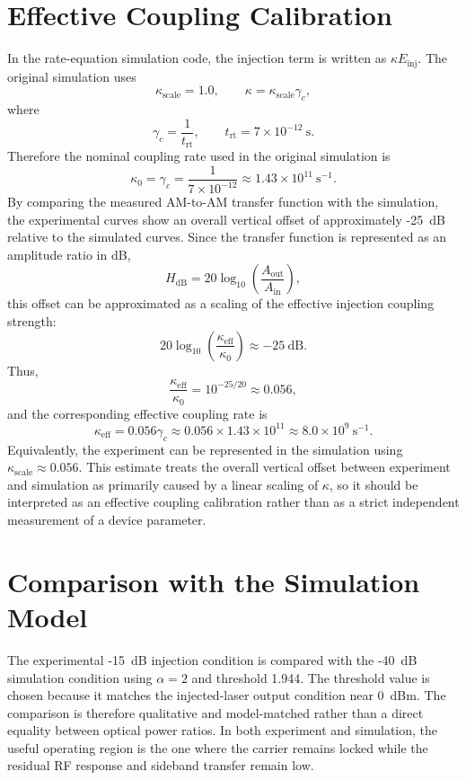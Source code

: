 \section{Effective Coupling Calibration}

In the rate-equation simulation code, the injection term is written as $\kappa E_{\mathrm{inj}}$. The original simulation uses
\[
\kappa_{\mathrm{scale}} = 1.0,\qquad
\kappa = \kappa_{\mathrm{scale}}\gamma_c,
\]
where
\[
\gamma_c=\frac{1}{t_{\mathrm{rt}}},\qquad
t_{\mathrm{rt}}=7\times10^{-12}~\mathrm{s}.
\]
Therefore the nominal coupling rate used in the original simulation is
\[
\kappa_0=\gamma_c=\frac{1}{7\times10^{-12}}
\approx 1.43\times10^{11}~\mathrm{s^{-1}}.
\]
By comparing the measured AM-to-AM transfer function with the simulation, the experimental curves show an overall vertical offset of approximately -25~dB relative to the simulated curves. Since the transfer function is represented as an amplitude ratio in dB,
\[
H_{\mathrm{dB}}
=
20\log_{10}
\left(
\frac{A_{\mathrm{out}}}{A_{\mathrm{in}}}
\right),
\]
this offset can be approximated as a scaling of the effective injection coupling strength:
\[
20\log_{10}
\left(
\frac{\kappa_{\mathrm{eff}}}{\kappa_0}
\right)
\approx -25~\mathrm{dB}.
\]
Thus,
\[
\frac{\kappa_{\mathrm{eff}}}{\kappa_0}
=
10^{-25/20}
\approx 0.056,
\]
and the corresponding effective coupling rate is
\[
\kappa_{\mathrm{eff}}
=
0.056\gamma_c
\approx
0.056\times1.43\times10^{11}
\approx
8.0\times10^9~\mathrm{s^{-1}}.
\]
Equivalently, the experiment can be represented in the simulation using $\kappa_{\mathrm{scale}}\approx0.056$. This estimate treats the overall vertical offset between experiment and simulation as primarily caused by a linear scaling of $\kappa$, so it should be interpreted as an effective coupling calibration rather than as a strict independent measurement of a device parameter.

\section{Comparison with the Simulation Model}

The experimental -15~dB injection condition is compared with the -40~dB simulation condition using $\alpha=2$ and threshold 1.944. The threshold value is chosen because it matches the injected-laser output condition near 0~dBm. The comparison is therefore qualitative and model-matched rather than a direct equality between optical power ratios. In both experiment and simulation, the useful operating region is the one where the carrier remains locked while the residual RF response and sideband transfer remain low.


